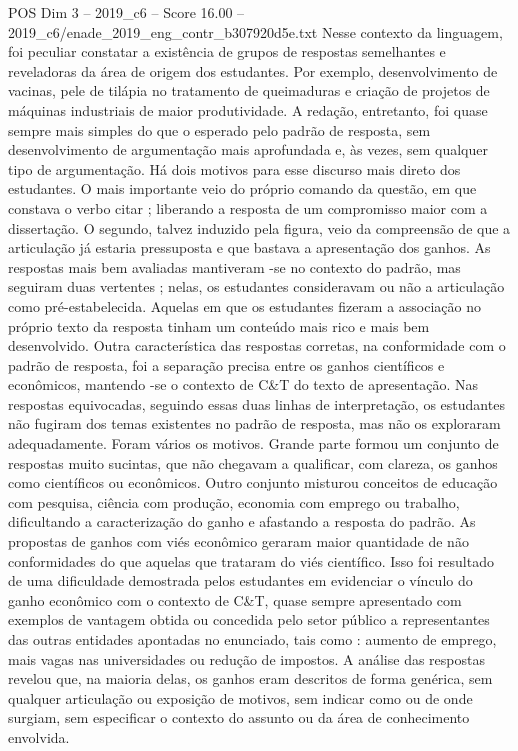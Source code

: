 \begin{textsample}{POS Dim 3 – 2019\_c6 – Score 16.00 – 2019\_c6/enade\_2019\_eng\_contr\_b307920d5e.txt}
Nesse contexto da linguagem, foi peculiar constatar a existência de grupos de respostas semelhantes e reveladoras da área de origem dos estudantes.
Por exemplo, desenvolvimento de vacinas, pele de tilápia no tratamento de queimaduras e criação de projetos de máquinas industriais de maior produtividade.
A redação, entretanto, foi quase sempre mais simples do que o esperado pelo padrão de resposta, sem desenvolvimento de argumentação mais aprofundada e, às vezes, sem qualquer tipo de argumentação.
Há dois motivos para esse discurso mais direto dos estudantes.
O mais importante veio do próprio comando da questão, em que constava o verbo citar ; liberando a resposta de um compromisso maior com a dissertação.
O segundo, talvez induzido pela figura, veio da compreensão de que a articulação já estaria pressuposta e que bastava a apresentação dos ganhos.
As respostas mais bem avaliadas mantiveram -se no contexto do padrão, mas seguiram duas vertentes ; nelas, os estudantes consideravam ou não a articulação como pré-estabelecida.
Aquelas em que os estudantes fizeram a associação no próprio texto da resposta tinham um conteúdo mais rico e mais bem desenvolvido.
Outra característica das respostas corretas, na conformidade com o padrão de resposta, foi a separação precisa entre os ganhos científicos e econômicos, mantendo -se o contexto de C\&T do texto de apresentação.
Nas respostas equivocadas, seguindo essas duas linhas de interpretação, os estudantes não fugiram dos temas existentes no padrão de resposta, mas não os exploraram adequadamente.
Foram vários os motivos.
Grande parte formou um conjunto de respostas muito sucintas, que não chegavam a qualificar, com clareza, os ganhos como científicos ou econômicos.
Outro conjunto misturou conceitos de educação com pesquisa, ciência com produção, economia com emprego ou trabalho, dificultando a caracterização do ganho e afastando a resposta do padrão.
As propostas de ganhos com viés econômico geraram maior quantidade de não conformidades do que aquelas que trataram do viés científico.
Isso foi resultado de uma dificuldade demostrada pelos estudantes em evidenciar o vínculo do ganho econômico com o contexto de C\&T, quase sempre apresentado com exemplos de vantagem obtida ou concedida pelo setor público a representantes das outras entidades apontadas no enunciado, tais como : aumento de emprego, mais vagas nas universidades ou redução de impostos.
A análise das respostas revelou que, na maioria delas, os ganhos eram descritos de forma genérica, sem qualquer articulação ou exposição de motivos, sem indicar como ou de onde surgiam, sem especificar o contexto do assunto ou da área de conhecimento envolvida.

\end{textsample}
